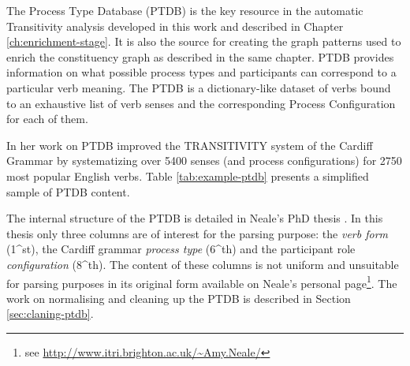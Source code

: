 The Process Type Database (PTDB) \citep{Neale2002} is the key resource in the automatic Transitivity analysis developed in this work and described in Chapter \ref{ch:enrichment-stage}. It is also the source for creating the graph patterns used to enrich the constituency graph as described in the same chapter. PTDB provides information on what possible process types and participants can correspond to a particular verb meaning. The PTDB is a dictionary-like dataset of verbs bound to an exhaustive list of verb senses and the corresponding Process Configuration for each of them.

In her work on PTDB \citet{Neale2002} improved the TRANSITIVITY system of the Cardiff Grammar by systematizing over 5400 senses (and process configurations) for  2750 most popular English verbs. Table \ref{tab:example-ptdb} presents a simplified sample of PTDB content.

\begin{table}[!ht]
    \centering
    \caption{An example of records ins PTDB}
    \label{tab:example-ptdb}
\end{table}

The internal structure of the PTDB is detailed in Neale's PhD thesis \citep[193--231]{Neale2002}. In this thesis only three columns are of interest for the parsing purpose: the \textit{verb form} (1^{st}), the Cardiff grammar \textit{process type} (6^{th}) and the participant role \textit{configuration} (8^{th}). The content of these columns is not uniform and unsuitable for parsing purposes in its original form available on Neale's personal page\footnote{see \url{http://www.itri.brighton.ac.uk/~Amy.Neale/}}. The work on normalising and cleaning up the PTDB is described in Section \ref{sec:claning-ptdb}.


